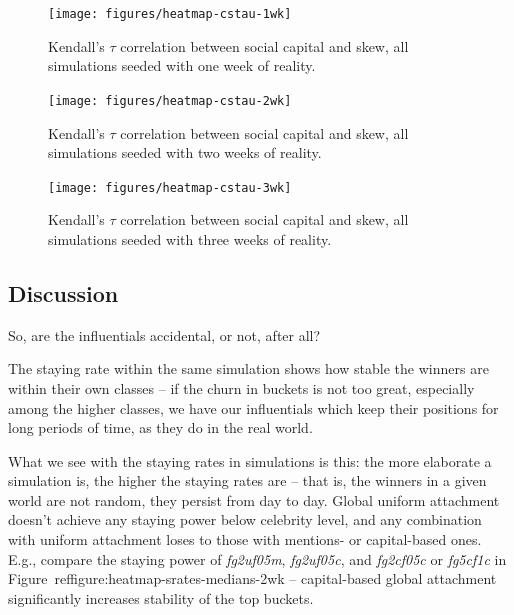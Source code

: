 \documentclass[10pt,oneside]{memoir}
\begin{document}
\begin{Spacing}{2}
\begin{figure}
\begin{center}
    \texttt{[image: figures/heatmap-cstau-1wk]}
    \caption{Kendall’s $\tau$ correlation between social capital and skew, all simulations seeded with one week of reality.}
    \label{figure:heatmap-cstau-1wk}
\end{center}
\end{figure}

\begin{figure}
\begin{center}
    \texttt{[image: figures/heatmap-cstau-2wk]}
    \caption{Kendall’s $\tau$ correlation between social capital and skew, all simulations seeded with two weeks of reality.}
    \label{figure:heatmap-cstau-2wk}
\end{center}
\end{figure}

\begin{figure}
\begin{center}
    \texttt{[image: figures/heatmap-cstau-3wk]}
    \caption{Kendall’s $\tau$ correlation between social capital and skew, all simulations seeded with three weeks of reality.}
    \label{figure:heatmap-cstau-3wk}
\end{center}
\end{figure}
\pagebreak \subsection{Discussion}
\label{discussion}

\label{section:discussion}
So, are the influentials accidental, or not, after all?


The staying rate within the same simulation shows how stable the winners are within their own classes -- if the churn in buckets is not too great, especially among the higher classes, we have our influentials which keep their positions for long periods of time, as they do in the real world.


What we see with the staying rates in simulations is this: the more elaborate a simulation is, the higher the staying rates are -- that is, the winners in a given world are not random, they persist from day to day.  Global uniform attachment doesn't achieve any staying power below celebrity level, and any combination with uniform attachment loses to those with mentions- or capital-based ones.  E.g., compare the staying power of {\itshape fg2uf05m}, {\itshape fg2uf05c}, and {\itshape fg2cf05c} or {\itshape fg5cf1c} in Figure~ref{figure:heatmap-srates-medians-2wk} -- capital-based global attachment significantly increases stability of the top buckets.



\end{Spacing}
\end{document}
